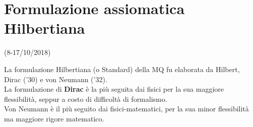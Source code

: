 \documentclass[FisicaTeorica.tex]{subfiles}
\begin{document}
\chapter{Formulazione assiomatica Hilbertiana}
\vspace{-1em}
\begin{center}
    \small{(8-17/10/2018)}
\end{center}

La formulazione Hilbertiana (o Standard) della MQ fu elaborata da Hilbert, Dirac ('30) e von Neumann ('32).\\
La formulazione di \textbf{Dirac} è la più seguita dai fisici per la sua maggiore flessibilità, seppur a costo di difficoltà di formalismo.\\
Von Neumann è il più seguito dai fisici-matematici, per la sua minor flessibilità ma maggiore rigore matematico.
\end{document}
